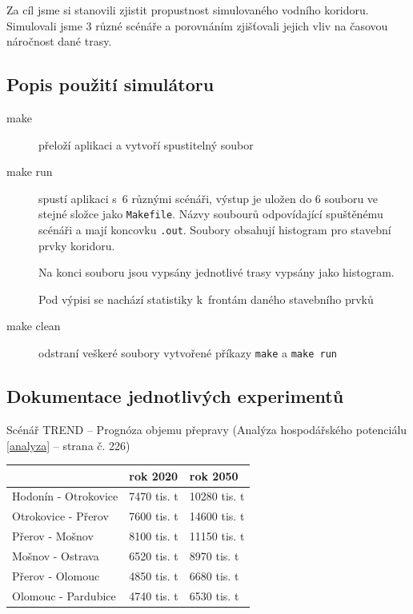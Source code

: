 \documentclass[11pt,a4paper]{article}
\begin{document}
    Za cíl jsme si stanovili zjistit propustnost simulovaného vodního koridoru.
    Simulovali jsme 3 různé scénáře a porovnáním zjišťovali jejich vliv na časovou
    náročnost dané trasy.

    \subsection{Popis použití simulátoru}
      
      \begin{description}
        \item [make] přeloží aplikaci a vytvoří spustitelný soubor
        \item [make run] spustí aplikaci s~6 různými scénáři,
                         výstup je uložen do 6 souboru ve stejné složce jako
                         \texttt{Makefile}. Názvy soubourů odpovídající
                         spuštěnému scénáři a mají koncovku \texttt{.out}.
                         Soubory obsahují histogram pro stavební prvky
                         koridoru.

                         Na konci souboru jsou vypsány jednotlivé trasy vypsány
                         jako histogram.

                         Pod výpisi se nachází statistiky k~frontám daného
                         stavebního prvků
        \item [make clean] odstraní veškeré soubory vytvořené příkazy
                           \texttt{make} a \texttt{make run}
      \end{description}

    \subsection{Dokumentace jednotlivých experimentů}

      \noindent 
      Scénář TREND -- Prognóza objemu přepravy (Analýza hospodářského
      potenciálu \ref{analyza} -- strana č. 226)
      \begin{center}
        \begin{tabular}{| l | l | l |}
          \hline
          & rok 2020 & rok 2050 \\ \hline
          Hodonín - Otrokovice & 7470 tis. t & 10280 tis. t \\ \hline
          Otrokovice - Přerov & 7600 tis. t & 14600 tis. t \\ \hline
          Přerov - Mošnov &  8100 tis. t & 11150 tis. t \\ \hline
          Mošnov - Ostrava & 6520 tis. t & 8970 tis. t \\ \hline
          Přerov - Olomouc & 4850 tis. t & 6680 tis. t \\ \hline
          Olomouc - Pardubice & 4740 tis. t & 6530 tis. t \\ \hline
          \end{tabular}
      \end{center}
\end{document}

